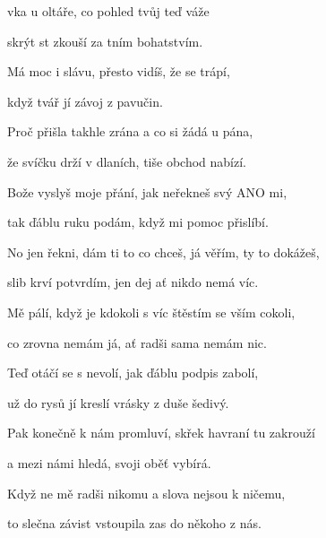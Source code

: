

\zs
{}vka u oltáře, co pohled tvůj teď váže

skrýt st zkouší za tním bohatstvím.

Má  moc i slávu, přesto vidíš, že se trápí,

když tvář  jí závoj z  pavučin.
\ks

\zr
{}     
\kr

\zs
Proč přišla takhle zrána a co si žádá u pána,

že svíčku drží v dlaních, tiše obchod nabízí.

Bože vyslyš moje přání, jak neřekneš svý ANO mi,

tak ďáblu ruku podám, když mi pomoc přislíbí.
\ks


\zr \kr

\zs
No jen řekni, dám ti to co chceš, já věřím, ty to dokážeš,

slib krví potvrdím, jen dej ať nikdo nemá víc.

Mě pálí, když je kdokoli s víc štěstím se vším cokoli,

co zrovna nemám já, ať radši sama nemám nic.
\ks

\zr \kr

\zs
Teď otáčí se s nevolí, jak ďáblu podpis zabolí,

už do rysů jí kreslí vrásky z duše šedivý.

Pak konečně k nám promluví, skřek havraní tu zakrouží

a mezi námi hledá, svoji oběť vybírá.

Když ne mě radši nikomu a slova nejsou k ničemu,

to slečna závist vstoupila zas do někoho z nás.
\ks

\zr \kr

\kp



















